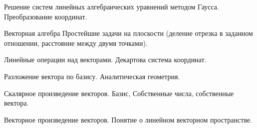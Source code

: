 \documentclass[
	14pt,
	a4paper,
	]
	{scrartcl}
\begin{document}
\vfill
\z Решение систем линейных алгебраических уравнений методом Гаусса.
 \vfill
\z Преобразование координат.
 \vfill

\vfill

\newpage


\shapk
{}
\setcounter{zad}{0}

\vfill
\z Векторная алгебра
 \vfill
\z Простейшие задачи на плоскости (деление отрезка в заданном отношении, расстояние между двумя точками).
 \vfill

\vfill

\newpage


\shapk
{}
\setcounter{zad}{0}

\vfill
\z Линейные операции над векторами.
 \vfill
\z Декартова система координат.
 \vfill

\vfill

\newpage


\shapk
{}
\setcounter{zad}{0}

\vfill
\z Разложение вектора по базису.
 \vfill
\z Аналитическая геометрия.
 \vfill

\vfill

\newpage


\shapk
{}
\setcounter{zad}{0}

\vfill
\z Скалярное произведение векторов.
 \vfill
\z Базис, Собственные числа, собственные вектора.
 \vfill

\vfill

\newpage


\shapk
{}
\setcounter{zad}{0}

\vfill
\z Векторное произведение векторов.
 \vfill
\z Понятие о линейном векторном пространстве.
 \vfill

\vfill

\newpage
\end{document}

